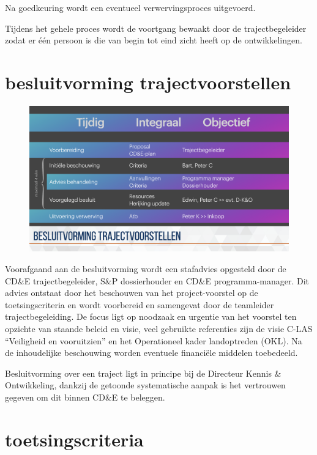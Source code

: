 \documentclass[
]{book}
\begin{document}
Na goedkeuring wordt een eventueel verwervingsproces uitgevoerd.

Tijdens het gehele proces wordt de voortgang bewaakt door de trajectbegeleider zodat er één persoon is die van begin tot eind zicht heeft op de ontwikkelingen.

\hypertarget{besluitvorming-trajectvoorstellen}{%
\section{besluitvorming trajectvoorstellen}\label{besluitvorming-trajectvoorstellen}}

\begin{figure}
\includegraphics[width=26.67in]{data/keynote-slides/20200430-CDE-Designprocess/20200430-CDE-Designprocess.037} \caption{ }\label{fig:unnamed-chunk-24}
\end{figure}

Voorafgaand aan de besluitvorming wordt een stafadvies opgesteld door de CD\&E trajectbegeleider, S\&P dossierhouder en CD\&E programma-manager. Dit advies ontstaat door het beschouwen van het project-voorstel op de toetsingscriteria en wordt voorbereid en samengevat door de teamleider trajectbegeleiding. De focus ligt op noodzaak en urgentie van het voorstel ten opzichte van staande beleid en visie, veel gebruikte referenties zijn de visie C-LAS ``Veiligheid en vooruitzien'' en het Operationeel kader landoptreden (OKL). Na de inhoudelijke beschouwing worden eventuele financiële middelen toebedeeld.

Besluitvorming over een traject ligt in principe bij de Directeur Kennis \& Ontwikkeling, dankzij de getoonde systematische aanpak is het vertrouwen gegeven om dit binnen CD\&E te beleggen.

\hypertarget{toetsingscriteria}{%
\section{toetsingscriteria}\label{toetsingscriteria}}
\end{document}
